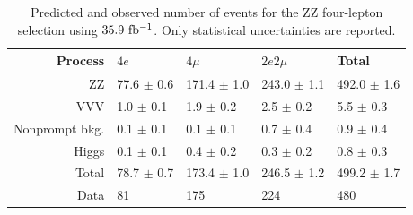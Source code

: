 \setlength{\tabcolsep}{12pt}
\begin{table}[!t]
  \caption{Predicted and observed number of events for the ZZ four-lepton selection using $35.9~\mathrm{fb^{-1}}$.
  Only statistical uncertainties are reported.
  \label{tab:zz4lyields}}
  \begin{center}
{\scriptsize
  \begin{tabular}{rllll}
\hline 
Process & $4e$ & $4\mu$ & $2e2\mu$ & Total \\
\hline
ZZ                    &   77.6 $\pm$  0.6 &  171.4 $\pm$  1.0 &  243.0 $\pm$     1.1 &  492.0 $\pm$     1.6 \\ 
VVV                   &    1.0 $\pm$  0.1 &    1.9 $\pm$  0.2 &    2.5 $\pm$     0.2 &    5.5 $\pm$     0.3 \\ 
Nonprompt bkg.        &    0.1 $\pm$  0.1 &    0.1 $\pm$  0.1 &    0.7 $\pm$     0.4 &    0.9 $\pm$     0.4 \\ 
Higgs                 &    0.1 $\pm$  0.1 &    0.4 $\pm$  0.2 &    0.3 $\pm$     0.2 &    0.8 $\pm$     0.3 \\ 
\hline                                                                               
Total                 &   78.7 $\pm$  0.7 &  173.4 $\pm$  1.0 &  246.5 $\pm$     1.2 &  499.2 $\pm$     1.7 \\
\hline                                                                               
Data                  &   81              &  175              &  224                 &  480                 \\
\hline
  \end{tabular}
}
  \end{center}
\end{table}


